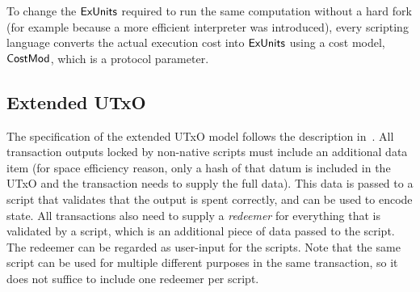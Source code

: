 To change the $\mathsf{ExUnits}$ required to
run the same computation without a hard fork (for example because a
more efficient interpreter was introduced), every scripting language
converts the actual execution cost into $\mathsf{ExUnits}$ using a cost model,
$\mathsf{CostMod}$, which is a protocol parameter.

\subsection{Extended UTxO}

The specification of the extended UTxO model follows the description in~\cite{plutus_eutxo}.
All transaction outputs locked by non-native scripts must include an additional data item (for space efficiency reason, only a hash of that datum is included in the UTxO and the transaction needs to supply the full data). This data is passed to a script that validates that the output is spent correctly, and can be used to encode state.
All transactions also need to supply a \emph{redeemer} for everything that is validated by a script, which is an additional piece of data passed to the script. The redeemer can be regarded as user-input for the scripts. Note that the same script can be used for multiple different purposes in the same transaction, so it does not suffice to include one redeemer per script.